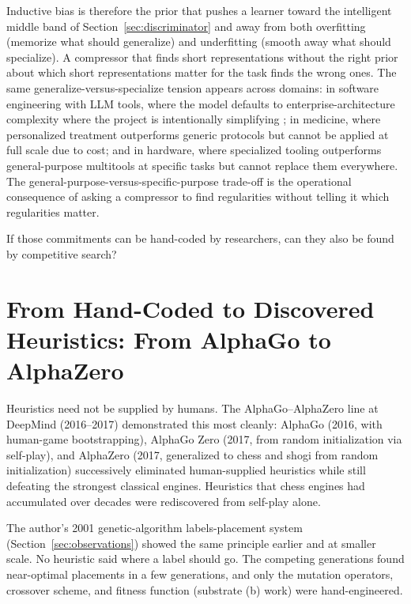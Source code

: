 \documentclass[11pt]{article}
\begin{document}
Inductive bias is therefore the prior that pushes a learner toward the intelligent middle band of Section~\ref{sec:discriminator} and away from both overfitting (memorize what should generalize) and underfitting (smooth away what should specialize). A compressor that finds short representations without the right prior about which short representations matter for the task finds the wrong ones. The same generalize-versus-specialize tension appears across domains: in software engineering with LLM tools, where the model defaults to enterprise-architecture complexity where the project is intentionally simplifying \citep{gavrilov_machines_generalize_2026}; in medicine, where personalized treatment outperforms generic protocols but cannot be applied at full scale due to cost; and in hardware, where specialized tooling outperforms general-purpose multitools at specific tasks but cannot replace them everywhere. The general-purpose-versus-specific-purpose trade-off is the operational consequence of asking a compressor to find regularities without telling it which regularities matter.

If those commitments can be hand-coded by researchers, can they also be found by competitive search?

\section{From Hand-Coded to Discovered Heuristics: From AlphaGo to AlphaZero}\label{sec:discovery}

Heuristics need not be supplied by humans. The AlphaGo--AlphaZero line at DeepMind (2016--2017) demonstrated this most cleanly: AlphaGo (2016, with human-game bootstrapping), AlphaGo Zero (2017, from random initialization via self-play), and AlphaZero (2017, generalized to chess and shogi from random initialization) successively eliminated human-supplied heuristics while still defeating the strongest classical engines. Heuristics that chess engines had accumulated over decades were rediscovered from self-play alone.

The author's 2001 genetic-algorithm labels-placement system (Section~\ref{sec:observations}) showed the same principle earlier and at smaller scale. No heuristic said where a label should go. The competing generations found near-optimal placements in a few generations, and only the mutation operators, crossover scheme, and fitness function (substrate (b) work) were hand-engineered.
\end{document}
